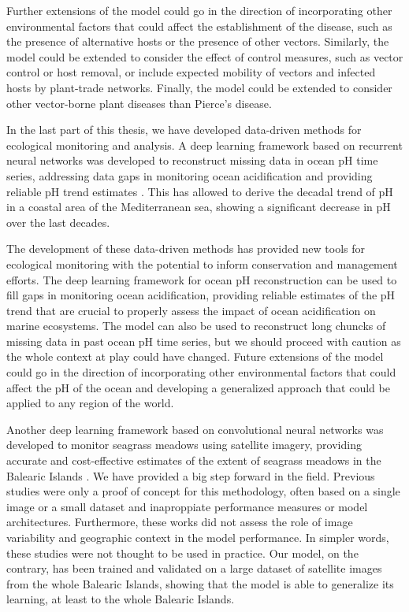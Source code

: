 Further extensions of the model could go in the direction of incorporating
other environmental factors that could affect the establishment of the disease,
such as the presence of alternative hosts or the presence of other vectors.
Similarly, the model could be extended to consider the effect of control
measures, such as vector control or host removal, or include expected mobility
of vectors and infected hosts by plant-trade networks. Finally, the model could
be extended to consider other vector-borne plant diseases than Pierce's
disease.

In the last part of this thesis, we have developed data-driven methods for
ecological monitoring and analysis. A deep learning framework based on
recurrent neural networks was developed to reconstruct missing data in ocean
pH time series, addressing data gaps in monitoring ocean acidification and
providing reliable pH trend estimates \cite{Flecha2022}. This has allowed to
derive the decadal trend of pH in a coastal area of the Mediterranean sea,
showing a significant decrease in pH over the last decades.

The development of these data-driven methods has provided new tools for
ecological monitoring with the potential to inform conservation and management
efforts. The deep learning framework for ocean pH reconstruction can be used to
fill gaps in monitoring ocean acidification, providing reliable estimates of
the pH trend that are crucial to properly assess the impact of ocean
acidification on marine ecosystems. The model can also be used to reconstruct
long chuncks of missing data in past ocean pH time series, but we should
proceed with caution as the whole context at play could have changed. Future
extensions of the model could go in the direction of incorporating other
environmental factors that could affect the pH of the ocean and developing a
generalized approach that could be applied to any region of the world.

Another deep learning framework based on convolutional neural networks was
developed to monitor seagrass meadows using satellite imagery, providing
accurate and cost-effective estimates of the extent of seagrass meadows in the
Balearic Islands \cite{GimenezRomero2024_posi}. We have provided a big step
forward in the field. Previous studies were only a proof of concept for this
methodology, often based on a single image or a small dataset and inaproppiate
performance measures or model architectures. Furthermore, these works did not
assess the role of image variability and geographic context in the model
performance. In simpler words, these studies were not thought to be used in
practice. Our model, on the contrary, has been trained and validated on a large
dataset of satellite images from the whole Balearic Islands, showing that the
model is able to generalize its learning, at least to the whole Balearic
Islands.

